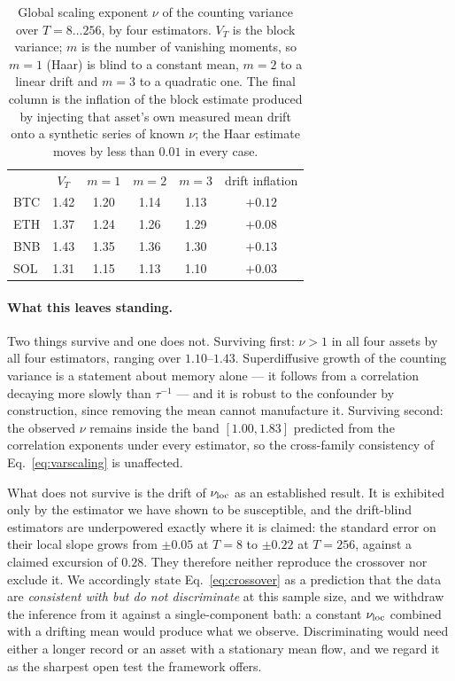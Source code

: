 \documentclass[aps,pre,twocolumn,superscriptaddress,floatfix,nofootinbib]{revtex4-2}
\begin{document}
\begin{table}[t]
  \caption{Global scaling exponent $\nu$ of the counting variance over
  $T=8\ldots256$, by four estimators. $V_T$ is the block variance;
  $m$ is the number of vanishing moments, so $m=1$ (Haar) is blind to a
  constant mean, $m=2$ to a linear drift and $m=3$ to a quadratic one. The
  final column is the inflation of the block estimate produced by injecting
  that asset's own measured mean drift onto a synthetic series of known
  $\nu$; the Haar estimate moves by less than $0.01$ in every case.}
  \label{tab:haar}
  \begin{ruledtabular}
  \begin{tabular}{lccccc}
   & $V_T$ & $m{=}1$ & $m{=}2$ & $m{=}3$ & drift inflation \\
  \colrule
  BTC & 1.42 & 1.20 & 1.14 & 1.13 & $+0.12$ \\
  ETH & 1.37 & 1.24 & 1.26 & 1.29 & $+0.08$ \\
  BNB & 1.43 & 1.35 & 1.36 & 1.30 & $+0.13$ \\
  SOL & 1.31 & 1.15 & 1.13 & 1.10 & $+0.03$ \\
  \end{tabular}
  \end{ruledtabular}
\end{table}

\paragraph*{What this leaves standing.}
Two things survive and one does not. Surviving first: $\nu>1$ in all four
assets by all four estimators, ranging over $1.10$--$1.43$. Superdiffusive
growth of the counting variance is a statement about memory alone --- it
follows from a correlation decaying more slowly than $\tau^{-1}$ --- and it is
robust to the confounder by construction, since removing the mean cannot
manufacture it. Surviving second: the observed $\nu$ remains inside the band
$[1.00,1.83]$ predicted from the correlation exponents under every estimator,
so the cross-family consistency of Eq.~\eqref{eq:varscaling} is unaffected.

What does not survive is the drift of $\nu_{\rm loc}$ as an established result.
It is exhibited only by the estimator we have shown to be susceptible, and the
drift-blind estimators are underpowered exactly where it is claimed: the
standard error on their local slope grows from $\pm0.05$ at $T=8$ to $\pm0.22$
at $T=256$, against a claimed excursion of $0.28$. They therefore neither
reproduce the crossover nor exclude it. We accordingly state
Eq.~\eqref{eq:crossover} as a prediction that the data are \emph{consistent
with but do not discriminate} at this sample size, and we withdraw the
inference from it against a single-component bath: a constant $\nu_{\rm loc}$
combined with a drifting mean would produce what we observe. Discriminating
would need either a longer record or an asset with a stationary mean flow, and
we regard it as the sharpest open test the framework offers.
\end{document}
